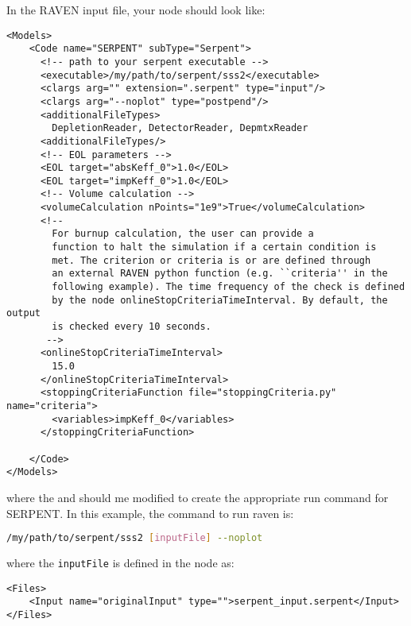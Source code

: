 In the RAVEN input file, your  node should look like:
\begin{lstlisting}[style=XML]
<Models>
    <Code name="SERPENT" subType="Serpent">
      <!-- path to your serpent executable -->
      <executable>/my/path/to/serpent/sss2</executable>
      <clargs arg="" extension=".serpent" type="input"/>
      <clargs arg="--noplot" type="postpend"/>
      <additionalFileTypes>
        DepletionReader, DetectorReader, DepmtxReader
      <additionalFileTypes/>
      <!-- EOL parameters -->
      <EOL target="absKeff_0">1.0</EOL>
      <EOL target="impKeff_0">1.0</EOL>
      <!-- Volume calculation -->
      <volumeCalculation nPoints="1e9">True</volumeCalculation>
      <!--
        For burnup calculation, the user can provide a
        function to halt the simulation if a certain condition is
        met. The criterion or criteria is or are defined through
        an external RAVEN python function (e.g. ``criteria'' in the
        following example). The time frequency of the check is defined
        by the node onlineStopCriteriaTimeInterval. By default, the output
        is checked every 10 seconds.
       -->
      <onlineStopCriteriaTimeInterval>
        15.0
      </onlineStopCriteriaTimeInterval>
      <stoppingCriteriaFunction file="stoppingCriteria.py" name="criteria">
        <variables>impKeff_0</variables>
      </stoppingCriteriaFunction>
      
    </Code>
</Models>
\end{lstlisting}
where the  and  should me modified
to create the appropriate run command for SERPENT. In this example, the command
to run raven is:
\begin{lstlisting}[language=bash]
/my/path/to/serpent/sss2 [inputFile] --noplot
\end{lstlisting}
where the \texttt{inputFile} is defined in the  node as:
\begin{lstlisting}[style=XML]
<Files>
    <Input name="originalInput" type="">serpent_input.serpent</Input>
</Files>
\end{lstlisting}

